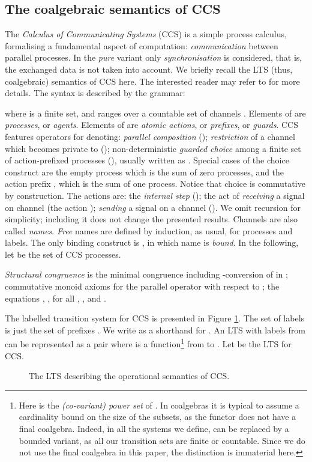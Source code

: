\documentclass[orivec]{llncs}
\newcommand{\defend}{}
\renewenvironment{definition}{\begin{defn}}{\defend\end{defn}}
\begin{document}
\subsection{The coalgebraic semantics of CCS}
\label{sec:CCS-coalgebra}

The \emph{Calculus of Communicating Systems} (CCS) is a simple process calculus, formalising a fundamental aspect of computation: \emph{communication} between parallel processes. In the \emph{pure} variant only \emph{synchronisation} is considered, that is, the exchanged data is not taken into account.
We briefly recall the LTS (thus, coalgebraic) semantics of CCS here. The interested reader may refer to \cite{Mil82} for more details.
The syntax is described by the grammar: 

where  is a finite set, and  ranges over a countable set of channels . Elements of  are \emph{processes}, or \emph{agents}. Elements of  are \emph{atomic actions}, or \emph{prefixes}, or \emph{guards}.  CCS features operators for denoting: \emph{parallel composition} (); \emph{restriction} of a channel  which becomes private to  ();  non-deterministic \emph{guarded choice} among a finite set of action-prefixed processes (), usually written as . Special cases of the choice construct are the empty process  which is the sum of zero processes, and the action prefix , which is the sum of one process. Notice that choice is commutative by construction. The actions  are: the \emph{internal step} (); the act of \emph{receiving} a signal on channel  (the action ); \emph{sending} a signal on a channel (). We omit recursion for simplicity; including it does not change the presented results.
Channels are also called \emph{names}. \emph{Free} names  are defined by induction, as usual, for processes and labels. The only binding construct is , in which name  is \emph{bound}.
In the following, let  be the set of CCS processes. 

\begin{definition}\label{def:structural-congruence}
\emph{Structural congruence} is the minimal congruence  including -conversion of  in ; commutative monoid axioms for the parallel operator with respect to ; the equations , ,  for all , ,  and . 
\end{definition}

The labelled transition system for CCS is presented in Figure \ref{fig:CCS-LTS}. The set  of labels is just the set of prefixes . We write  as a shorthand for .
An LTS with labels from  can be represented as a pair  where  is a function\footnote{Here  is the \emph{(co-variant) power set} of . In coalgebras it is typical to assume a cardinality bound on the size of the subsets, as the functor  does not have a final coalgebra. Indeed, in all the systems we define,  can be replaced by a bounded variant, as all our transition sets are finite or countable. Since we do not use the final coalgebra in this paper, the distinction is immaterial here.}
from  to .  Let  be the LTS for CCS.
\begin{figure}
	\begin{center}
			{\small 
				 }
	\end{center}
	\caption{The LTS describing the operational semantics of CCS.}\label{fig:CCS-LTS}
\end{figure}
\end{document}
